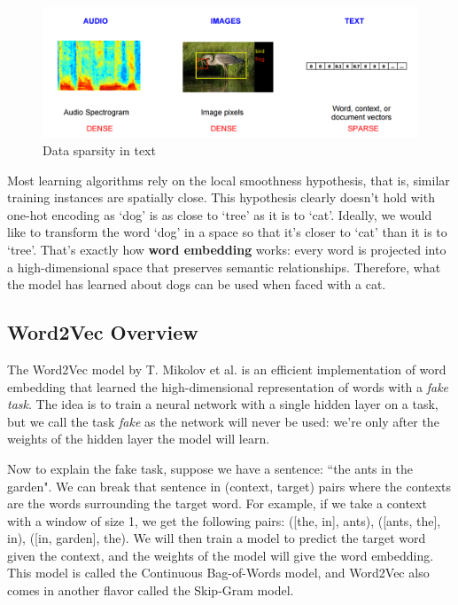 \begin{figure}[H]
    \centering
    \includegraphics[width=\textwidth]{Images/comparison-text.png}
    \caption{Data sparsity in text \cite{comparison-text}}
    \label{comparison-text}
\end{figure}

Most learning algorithms rely on the local smoothness hypothesis, that is, similar training instances are spatially close. This hypothesis clearly doesn't hold with one-hot encoding as `dog' is as close to `tree' as it is to `cat'. Ideally, we would like to transform the word `dog' in a space so that it's closer to `cat' than it is to `tree'. That's exactly how \textbf{word embedding} works: every word is projected into a high-dimensional space that preserves semantic relationships. Therefore, what the model has learned about dogs can be used when faced with a cat.

\subsection{Word2Vec Overview}
The Word2Vec model by T. Mikolov et al. \cite{word2vec} is an efficient implementation of word embedding that learned the high-dimensional representation of words with a {\em fake task}. The idea is to train a neural network with a single hidden layer on a task, but we call the task {\em fake} as the network will never be used: we're only after the weights of the hidden layer the model will learn.

Now to explain the fake task, suppose we have a sentence: ``the ants in the garden". We can break that sentence in (context, target) pairs where the contexts are the words surrounding the target word. For example, if we take a context with a window of size 1, we get the following pairs: ([the, in], ants), ([ants, the], in), ([in, garden], the). We will then train a model to predict the target word given the context, and the weights of the model will give the word embedding. This model is called the Continuous Bag-of-Words model, and Word2Vec also comes in another flavor called the Skip-Gram model.

